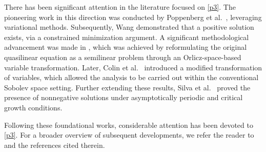 \documentclass[10pt,a4paper]{amsart}
\numberwithin{equation}{section}
\begin{document}
There has been significant attention in the literature focused on  \eqref{p3}. 
The pioneering work in this direction was conducted by Poppenberg et al.\ \cite{Poppenberg}, leveraging variational methods. Subsequently, Wang \cite{Wang1} demonstrated that a positive 
solution exists, via a constrained minimization argument. A significant methodological advancement 
was made in \cite{Wang2}, which was achieved by reformulating the original quasilinear equation as 
a semilinear problem through an Orlicz-space-based variable transformation. Later, Colin et al.\ 
\cite{colin} introduced a modified transformation of variables, which allowed the analysis to be 
carried out within the conventional Sobolev space setting. Further extending these results, 
Silva et al.\ \cite{Silva} proved the presence of  nonnegative  solutions under asymptotically 
periodic and critical growth conditions.

Following these foundational works, considerable attention has been devoted to \eqref{p3}. 
For a broader overview of subsequent developments, we refer the reader to 
\cite{fang3, fang2, Jeanjean, Lehrer,  Xue} and the references cited therein. 
\end{document}
